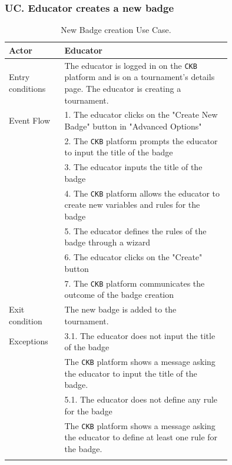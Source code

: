 \subsubsection*{UC\cuc . Educator creates a new badge}
\begin{center}
    \begin{longtable}{lp{0.75\linewidth}}
        \hline
        Actor            & Educator \\
        \hline
        Entry conditions & The educator is logged in on the \verb|CKB| platform and is on a tournament's details page. The educator is creating a tournament.\\
        \hline
        Event Flow      
        & 1. The educator clicks on the "Create New Badge" button in "Advanced Options"\\
        & 2. The \verb|CKB| platform prompts the educator to input the title of the badge\\
        & 3. The educator inputs the title of the badge\\
        & 4. The \verb|CKB| platform allows the educator to create new variables and rules for the badge\\
        & 5. The educator defines the rules of the badge through a wizard\\
        & 6. The educator clicks on the "Create" button\\
        & 7. The \verb|CKB| platform communicates the outcome of the badge creation\\
        \hline
        Exit condition   & The new badge is added to the tournament.   \\
        \hline
        Exceptions
        & 3.1. The educator does not input the title of the badge\\
            & The \verb|CKB| platform shows a message asking the educator to input the title of the badge.  \\
        & 5.1. The educator does not define any rule for the badge\\
            & The \verb|CKB| platform shows a message asking the educator to define at least one rule for the badge.  \\
        \hline
        \caption{New Badge creation Use Case.}
        \label{tab: badge_creation_use_case}
    \end{longtable}


\end{center}
